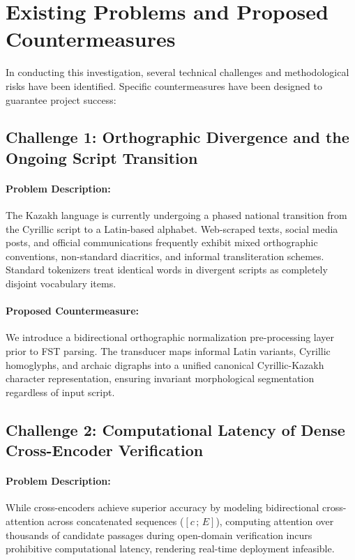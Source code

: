 \section{Existing Problems and Proposed Countermeasures}
\label{sec:problems}

In conducting this investigation, several technical challenges and methodological risks have been identified. Specific countermeasures have been designed to guarantee project success:

\subsection{Challenge 1: Orthographic Divergence and the Ongoing Script Transition}
\paragraph{Problem Description:} The Kazakh language is currently undergoing a phased national transition from the Cyrillic script to a Latin-based alphabet. Web-scraped texts, social media posts, and official communications frequently exhibit mixed orthographic conventions, non-standard diacritics, and informal transliteration schemes. Standard tokenizers treat identical words in divergent scripts as completely disjoint vocabulary items.
\paragraph{Proposed Countermeasure:} We introduce a bidirectional orthographic normalization pre-processing layer prior to FST parsing. The transducer maps informal Latin variants, Cyrillic homoglyphs, and archaic digraphs into a unified canonical Cyrillic-Kazakh character representation, ensuring invariant morphological segmentation regardless of input script.

\subsection{Challenge 2: Computational Latency of Dense Cross-Encoder Verification}
\paragraph{Problem Description:} While cross-encoders achieve superior accuracy by modeling bidirectional cross-attention across concatenated sequences ($[c \,;\, E]$), computing attention over thousands of candidate passages during open-domain verification incurs prohibitive computational latency, rendering real-time deployment infeasible.
